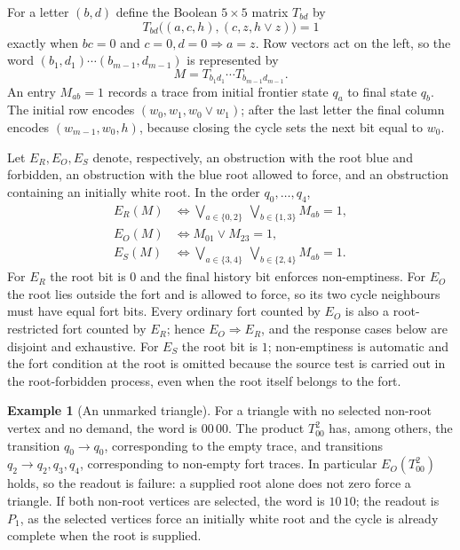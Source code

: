 \documentclass[11pt,reqno]{amsart}
\theoremstyle{definition}
\newtheorem{example}[example]{Example}
\begin{document}
For a letter $(b,d)$ define the Boolean $5\times5$ matrix $T_{bd}$ by
\begin{equation}\label{eq:letter-transition}
  T_{bd}\bigl((a,c,h),(c,z,h\vee z)\bigr)=1
\end{equation}
exactly when $bc=0$ and
$c=0,d=0\Longrightarrow a=z$.  Row vectors act on the left, so the word
$(b_1,d_1)\cdots(b_{m-1},d_{m-1})$ is represented by
\[
  M=T_{b_1d_1}\cdots T_{b_{m-1}d_{m-1}}.
\]
An entry $M_{ab}=1$ records a trace from initial frontier state $q_a$ to final
state $q_b$.  The initial row encodes $(w_0,w_1,w_0\vee w_1)$; after the last
letter the final column encodes $(w_{m-1},w_0,h)$, because closing the cycle
sets the next bit equal to $w_0$.

Let $E_R,E_O,E_S$ denote, respectively, an obstruction with the root blue and
forbidden, an obstruction with the blue root allowed to force, and an
obstruction containing an initially white root.  In the order
$q_0,\ldots,q_4$,
\begin{align}
 E_R(M)&\Longleftrightarrow
     \bigvee_{a\in\{0,2\}}\ \bigvee_{b\in\{1,3\}}M_{ab}=1,
     \label{eq:ER}\\
 E_O(M)&\Longleftrightarrow M_{01}\vee M_{23}=1,
     \label{eq:EO}\\
 E_S(M)&\Longleftrightarrow
     \bigvee_{a\in\{3,4\}}\ \bigvee_{b\in\{2,4\}}M_{ab}=1.
     \label{eq:ES}
\end{align}
For $E_R$ the root bit is $0$ and the final history bit enforces non-emptiness.
For $E_O$ the root lies outside the fort and is allowed to force, so its two
cycle neighbours must have equal fort bits.  Every ordinary fort counted by
$E_O$ is also a root-restricted fort counted by $E_R$; hence
$E_O\Rightarrow E_R$, and the response cases below are disjoint and
exhaustive.  For $E_S$ the root bit is $1$; non-emptiness is automatic and the
fort condition at the root is omitted because the source test is carried out
in the root-forbidden process, even when the root itself belongs to the fort.

\begin{example}[An unmarked triangle]\label{ex:triangle-automaton}
For a triangle with no selected non-root vertex and no demand, the word is
$00\,00$.  The product $T_{00}^2$ has, among others, the transition
$q_0\to q_0$, corresponding to the empty trace, and transitions
$q_2\to q_2,q_3,q_4$, corresponding to non-empty fort traces.  In particular
$E_O(T_{00}^2)$ holds, so the readout is failure: a supplied root alone does
not zero force a triangle.  If both non-root vertices are selected, the word
is $10\,10$; the readout is $P_1$, as the selected vertices force an initially
white root and the cycle is already complete when the root is supplied.
\end{example}
\end{document}
